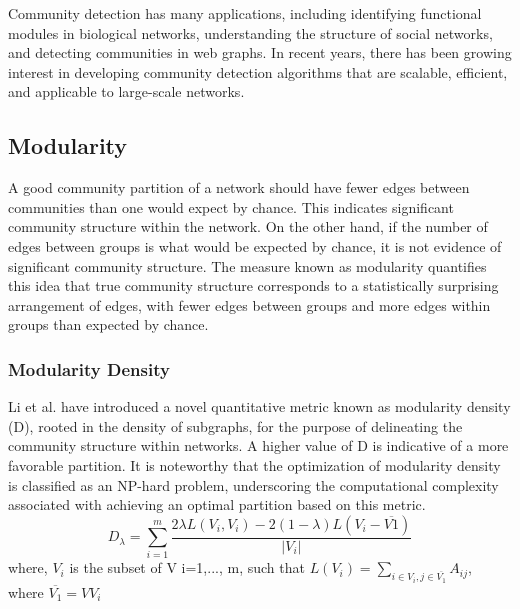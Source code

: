 Community detection has many applications, including identifying functional modules in biological networks, understanding the structure of social networks, and detecting communities in web graphs. In recent years, there has been growing interest in developing community detection algorithms that are scalable, efficient, and applicable to large-scale networks.
\subsection{Modularity}
A good community partition of a network should have fewer edges between communities than one would expect by chance. This indicates significant community structure within the network. On the other hand, if the number of edges between groups is what would be expected by chance, it is not evidence of significant community structure. The measure known as modularity quantifies this idea that true community structure corresponds to a statistically surprising arrangement of edges, with fewer edges between groups and more edges within groups than expected by chance.\\
\subsubsection{Modularity Density}
Li et al. have introduced a novel quantitative metric known as modularity density (D), rooted in the density of subgraphs, for the purpose of delineating the community structure within networks. A higher value of D is indicative of a more favorable partition. It is noteworthy that the optimization of modularity density is classified as an NP-hard problem, underscoring the computational complexity associated with achieving an optimal partition based on this metric.\\
$$D_\lambda=\sum_{i=1}^{m} \frac{2\lambda L(V_i, V_i)-2(1-\lambda)L(V_i-\overline{V1})}{\vert {V_i}\vert }$$
where, $V_i$  is the subset of V i=1,..., m, such that $L(V_i)=\sum_{i\in V_{i}, j\in \overline{V_1}}A_{ij}$, where  $\overline{V_1}=VV_i$
